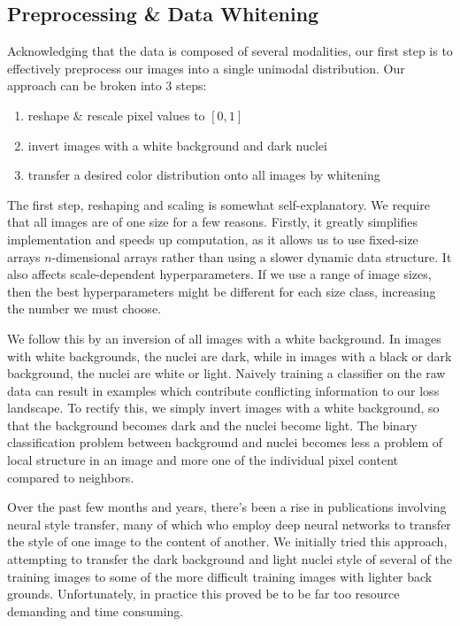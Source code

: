 \documentclass[paper=letter, fontsize=12pt]{article}
\numberwithin{equation}{section} %
\numberwithin{figure}{section} %
\numberwithin{table}{section} %
\begin{document}
\subsection{Preprocessing \& Data Whitening}

Acknowledging that the data is composed of several modalities, our first step
is to effectively preprocess our images into a single unimodal distribution.
Our approach can be broken into 3 steps:
\begin{enumerate}
    \item reshape \& rescale pixel values to $[0, 1]$
    \item invert images with a white background and dark nuclei
    \item transfer a desired color distribution onto all images by whitening
\end{enumerate}

The first step, reshaping and scaling is somewhat self-explanatory.  We require
that all images are of one size for a few reasons.  Firstly, it greatly
simplifies implementation and speeds up computation, as it allows us to use
fixed-size arrays $n$-dimensional arrays rather than using a slower dynamic
data structure.  It also affects scale-dependent hyperparameters.  If we use a
range of image sizes, then the best hyperparameters might be different for each
size class, increasing the number we must choose.

We follow this by an inversion of all images with a white background.  In
images with white backgrounds, the nuclei are dark, while in images with a
black or dark background, the nuclei are white or light.  Naively training a
classifier on the raw data can result in examples which contribute conflicting
information to our loss landscape.  To rectify this, we simply invert images
with a white background, so that the background becomes dark and the nuclei
become light.  The binary classification problem between background and nuclei
becomes less a problem of local structure in an image and more one of
the individual pixel content compared to neighbors.

Over the past few months and years, there's been a rise in publications
involving neural style transfer, many of which who employ deep neural networks
to transfer the style of one image to the content of another. We initially
tried this approach, attempting to transfer the dark background and light
nuclei style of several of the training images to some of the more difficult
training images with lighter back grounds. Unfortunately, in practice this
proved be to be far too resource demanding and time consuming.
\end{document}
